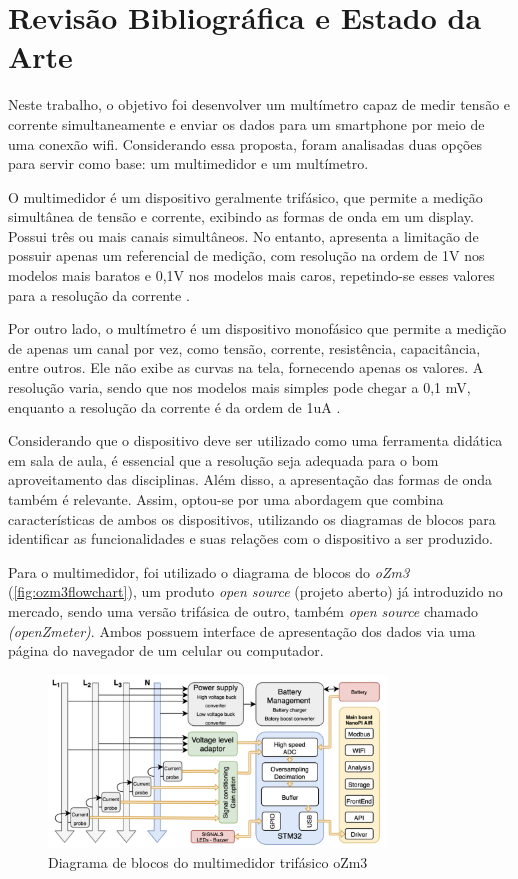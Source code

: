 \chapter{Revisão Bibliográfica e Estado da Arte}
\label{cap:refbib}

Neste trabalho, o objetivo foi desenvolver um multímetro capaz de medir tensão e corrente simultaneamente e enviar os dados para um smartphone por meio de uma conexão wifi. Considerando essa proposta, foram analisadas duas opções para servir como base: um multimedidor e um multímetro.

O multimedidor é um dispositivo geralmente trifásico, que permite a medição simultânea de tensão e corrente, exibindo as formas de onda em um display. Possui três ou mais canais simultâneos. No entanto, apresenta a limitação de possuir apenas um referencial de medição, com resolução na ordem de 1V nos modelos mais baratos e 0,1V nos modelos mais caros, repetindo-se esses valores para a resolução da corrente \cite{fluke434}.

Por outro lado, o multímetro é um dispositivo monofásico que permite a medição de apenas um canal por vez, como tensão, corrente, resistência, capacitância, entre outros. Ele não exibe as curvas na tela, fornecendo apenas os valores. A resolução varia, sendo que nos modelos mais simples pode chegar a 0,1 mV, enquanto a resolução da corrente é da ordem de 1uA \cite{et1100}.

Considerando que o dispositivo deve ser utilizado como uma ferramenta didática em sala de aula, é essencial que a resolução seja adequada para o bom aproveitamento das disciplinas. Além disso, a apresentação das formas de onda também é relevante. Assim, optou-se por uma abordagem que combina características de ambos os dispositivos, utilizando os diagramas de blocos para identificar as funcionalidades e suas relações com o dispositivo a ser produzido.

Para o multimedidor, foi utilizado o diagrama de blocos do \textit{oZm3} (\autoref{fig:ozm3flowchart}), um produto \textit{open source} (projeto aberto) já introduzido no mercado, sendo uma versão trifásica de outro, também \textit{open source} chamado \textit{(openZmeter)}. Ambos possuem interface de apresentação dos dados via uma página do navegador de um celular ou computador.

\begin{figure}[h]
    \caption{Diagrama de blocos do multimedidor trifásico oZm3}
    \label{fig:ozm3flowchart}
    \includegraphics[width=0.8\textwidth]{figuras/openzmeter-diagrama.png}
\end{figure}

